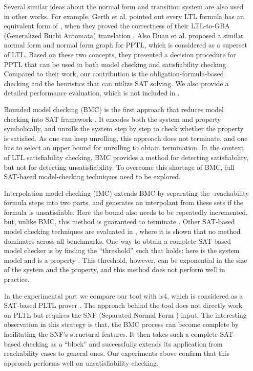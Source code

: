 \documentclass[conference]{IEEEtran}
\begin{document}
Several similar ideas about the normal form and transition system are also used 
in other works.  For example, Gerth et al. pointed out every LTL formula has an 
equivalent form of , when they proved the correctness 
of their LTL-to-GBA (Generalized B\"uchi Automata) translation \cite{GPVW95}. 
Also Duan et al. proposed a similar normal form and normal form graph for PPTL, 
which is considered as a superset of LTL\cite{DTZ08}.  Based on these two concepts, 
they presented a decision procedure for PPTL that can be used in both model checking 
and satisfiability checking. Compared to their work, our contribution 
is the obligation-formula-based checking and the heuristics that can utilize SAT solving. 
We also provide a detailed performance evaluation, which is not included in \cite{DTZ08}.

Bounded model checking (BMC) is the first approach that reduces model checking into SAT 
framework \cite{CBRZ01,CPRS02}. It encodes both the system and property symbolically, and 
unrolls the system step by step to check whether the property is satisfied. As one can keep
unrolling, this approach does not terminate, and one has to select an upper bound
 for unrolling to obtain termination. In the context of LTL satisfiability checking,
BMC provides a method for detecting satisfiability, but not for detecting unsatisfiability.
To overcome this shortage of BMC, full SAT-based model-checking techniques need to be explored. 

Interpolation model checking (IMC) \cite{McM03} extends BMC by separating the -reachability formula
steps into two parts, and generates an interpolant from these sets if the formula is unsatisfiable. 
Here the bound  also needs to be repeatedly incremented, but, unlike BMC, this method is
guaranteed to terminate \cite{McM03}. Other SAT-based model checking techniques are evaluated
in \cite{ADKKM05}, where it is shown that no method dominates across all benchmarks.
One way to obtain a complete SAT-based model checker is by finding the ``threshold''  such 
that  holds: here  is the system model and  is 
a property \cite{CKOS05}. This threshold, however, can be exponential in the size of the system
and the property, and this method does not perform well in practice.

In the experimental part we compare our tool with ls4, which is considered as a SAT-based PLTL prover \cite{SW12}. 
The approach behind the tool does not directly work on PLTL but requires the SNF (Separated Normal Form \cite{Fish97}) input. The 
interesting observation in this strategy is that, the BMC process can become complete by facilitating the SNF's structural 
features. It then takes such a complete SAT-based checking as a ``block'' and successfully extends its application from 
reachability cases to general ones. Our experiments above confirm that this approach performs well on unsatisfiability 
checking. 
\end{document}
